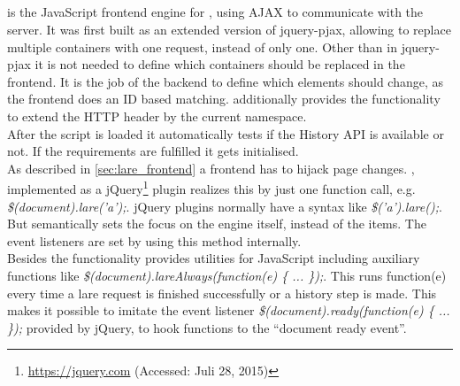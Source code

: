 \subsection{\lareJS{}}
\lareJS{} is the JavaScript frontend engine for \lare{}, using AJAX to communicate with the server.
It was first built as an extended version of jquery-pjax, allowing to replace multiple containers with one request, instead of only one.
Other than in jquery-pjax it is not needed to define which containers should be replaced in the frontend.
It is the job of the backend to define which elements should change, as the frontend does an ID based matching.
\lareJS{} additionally provides the functionality to extend the HTTP header by the current \lare{} namespace.
\\
After the script is loaded it automatically tests if the History API is available or not.
If the requirements are fulfilled it gets initialised.
\\
As described in \ref{sec:lare_frontend} a \lare{} frontend has to hijack page changes.
\lareJS{}, implemented as a jQuery\footnote{\url{https://jquery.com} (Accessed: Juli 28, 2015)} plugin realizes this by just one function call, e.g. \emph{\$(document).lare('a');}.
jQuery plugins normally have a syntax like \emph{\$('a').lare();}.
But semantically \lareJS{} sets the focus on the engine itself, instead of the items.
The event listeners are set by using this method internally.
\\
Besides the \lare{} functionality \lareJS{} provides utilities for JavaScript including auxiliary functions like \emph{\$(document).lareAlways(function(e) \{ ... \});}.
This runs function(e) {} every time a lare request is finished successfully or a history step is made.
This makes it possible to imitate the event listener \emph{\$(document).ready(function(e) \{ ... \});} provided by jQuery, to hook functions to the \enquote{document ready event}.
